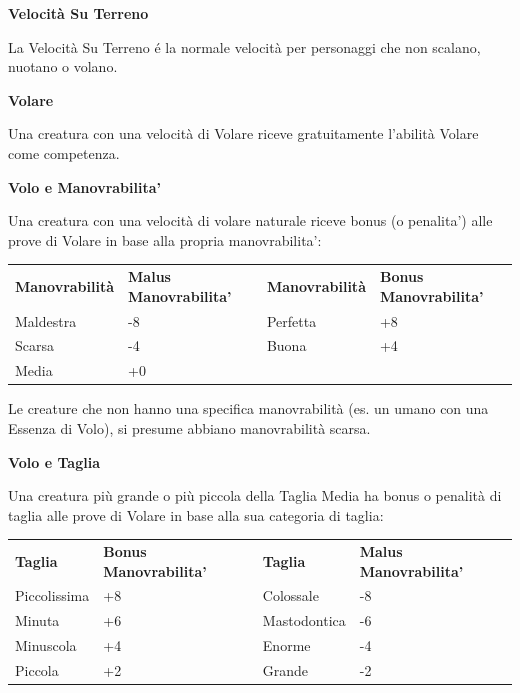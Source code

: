 \documentclass[a4paper,11pt,twoside,openany]{book}
\begin{document}
\textbf{Velocità Su Terreno}

La Velocità Su Terreno é la normale velocità per personaggi che non scalano, nuotano o volano.

\textbf{Volare}

Una creatura con una velocità di Volare riceve gratuitamente l'abilità Volare come competenza.

\textbf{Volo e Manovrabilita'}

\medskip

Una creatura con una velocità di volare naturale riceve bonus (o penalita') alle prove di Volare in base alla propria manovrabilita':

\begin{tabular}{llll}
	\hline
	\textbf{Manovrabilità} & \textbf{ Malus Manovrabilita'} & \textbf{Manovrabilità} & \textbf{ Bonus Manovrabilita'} \\
	Maldestra              & -8                             & Perfetta               & +8                             \\
	Scarsa                 & -4                             & Buona                  & +4                             \\
	Media                  & +0                                                                                       \\
\end{tabular}


Le creature che non hanno una specifica manovrabilità (es. un umano con una Essenza di Volo), si presume abbiano manovrabilità scarsa.

\textbf{Volo e Taglia}

Una creatura più grande o più piccola della Taglia Media ha bonus o penalità di taglia alle prove di Volare in base alla sua categoria di taglia:

\medskip

\begin{tabular}{llll}
	\hline
	\textbf{Taglia} & \textbf{ Bonus Manovrabilita'} & \textbf{Taglia} & \textbf{ Malus Manovrabilita'} \\
	Piccolissima    & +8                             & Colossale       & -8                             \\
	Minuta          & +6                             & Mastodontica    & -6                             \\
	Minuscola       & +4                             & Enorme          & -4                             \\
	Piccola         & +2                             & Grande          & -2                             \\
\end{tabular}
\end{document}
